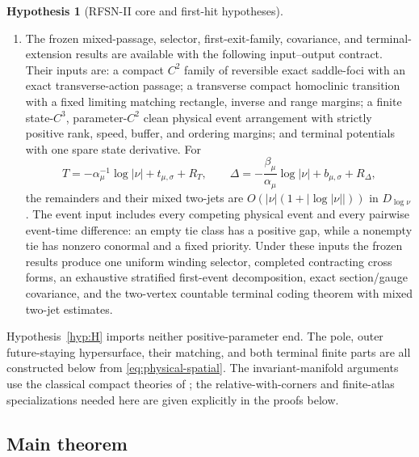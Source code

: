 \documentclass[11pt,reqno]{amsart}
\numberwithin{equation}{section}
\theoremstyle{definition}
\newtheorem{hypothesis}[theorem]{Hypothesis}
\theoremstyle{remark}
\begin{document}
\begin{hypothesis}[RFSN-II core and first-hit hypotheses]
\begin{enumerate}
\begin{equation}
 \end{equation}
 \item[${\rm(H_{ret})}$]
 The frozen mixed-passage, selector, first-exit-family, covariance, and
 terminal-extension results are available with the following input--output
 contract.  Their inputs are: a compact $C^2$ family of reversible exact
 saddle-foci with an exact transverse-action passage; a transverse compact
 homoclinic transition with a fixed limiting matching rectangle, inverse and
 range margins; a finite state-$C^3$, parameter-$C^2$ clean physical event
 arrangement with strictly positive rank, speed, buffer, and ordering
 margins; and terminal potentials with one spare state derivative.  For
 \[
  T=-\alpha_\mu^{-1}\log|\nu|+t_{\mu,\sigma}+R_T,\qquad
  \Delta=-\frac{\beta_\mu}{\alpha_\mu}\log|\nu|
            +b_{\mu,\sigma}+R_\Delta,
 \]
 the remainders and their mixed two-jets are
 $O(|\nu|(1+|\log|\nu||))$ in $D_{\log\nu}$.  The event input includes every
 competing physical event and every pairwise event-time difference: an empty
 tie class has a positive gap, while a nonempty tie has nonzero conormal and
 a fixed priority.  Under these inputs the frozen results produce one uniform
 winding selector, completed contracting cross forms, an exhaustive
 stratified first-event decomposition, exact section/gauge covariance, and the two-vertex
 countable terminal coding theorem with mixed two-jet estimates.
\end{enumerate}
\end{hypothesis}

Hypothesis~\ref{hyp:H} imports neither positive-parameter end.  The pole,
outer future-staying hypersurface, their matching, and both terminal finite
parts are all constructed below from \eqref{eq:physical-spatial}.  The
invariant-manifold arguments use the classical compact theories of
\cite{Fenichel1972,HirschPughShub1977}; the relative-with-corners and
finite-atlas specializations needed here are given explicitly in the proofs
below.

\subsection{Main theorem}
\end{document}
